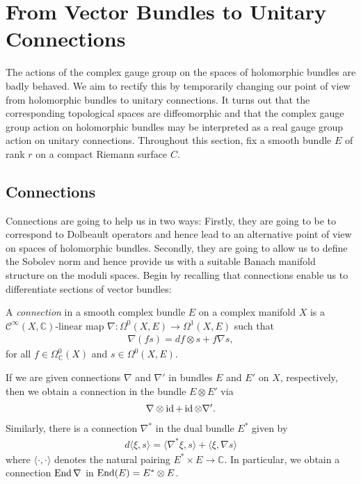 \documentclass[12pt]{ociamthesis}  %
\begin{document}
\section{From Vector Bundles to Unitary Connections}

The actions of the complex gauge group on the spaces of holomorphic
bundles are badly behaved. We aim to rectify this by temporarily
changing our point of view from holomorphic bundles to unitary
connections. It turns out that the corresponding topological spaces
are diffeomorphic and that the complex gauge group action on holomorphic bundles
may be interpreted as a real gauge group action on unitary connections.
Throughout this section, fix a smooth bundle $E$ of rank $r$ on a compact
Riemann surface $C$.

\subsection{Connections}

Connections are going to help us in two ways: Firstly, they are going to
be to correspond to Dolbeault operators and hence lead to an
alternative point of view on spaces of holomorphic bundles.
Secondly, they are going to allow us to define the Sobolev norm and
hence provide us with a suitable Banach manifold structure on
the moduli spaces.
Begin by recalling that connections enable us to differentiate sections of
vector bundles:

\begin{definition}
  A \emph{connection} in a smooth complex bundle $E$ on
  a complex manifold $X$ is a $\mathscr C^\infty(X,\mathbb C)$-linear
  map $\nabla : \Omega^0(X,E) \to \Omega^1(X,E)$
  such that
  \begin{align*}
    \nabla (fs) = df \otimes s + f\nabla s,
  \end{align*}
  for all $f\in \Omega^0_{\mathbb C}(X)$ and $s\in\Omega^0(X,E)$.
\end{definition}

\begin{example}\label{ex:connection_on_end}
  If we are given connections $\nabla$ and $\nabla'$ in bundles $E$ and $E'$ on $X$,
  respectively, then we obtain a connection in the bundle $E\otimes E'$ via
  \begin{align*}
    \nabla \otimes \operatorname{id} + \operatorname{id} \otimes \nabla'.
  \end{align*}
  Similarly, there is a connection $\nabla^*$ in the dual bundle $E^*$ given by
  \begin{align*}
    d\langle \xi,s\rangle
    = \langle \nabla^*\xi, s \rangle + \langle \xi,\nabla s\rangle
  \end{align*}
  where $\langle\cdot,\cdot\rangle$ denotes the natural pairing $E^*\times E\to\mathbb{C}$.
  In particular, we obtain a connection $\operatorname{End}\nabla$ in $\operatorname{End}(E) = E^* \otimes E$.
\end{example}
\end{document}
